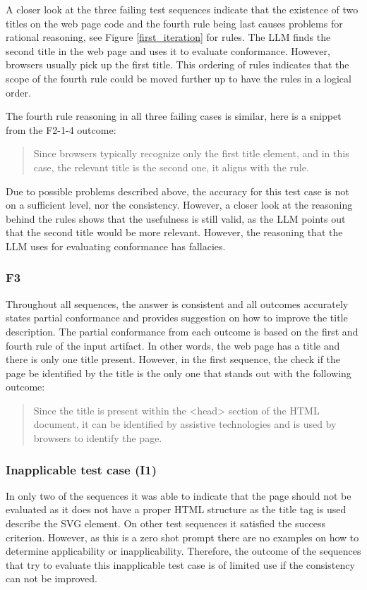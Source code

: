 A closer look at the three failing test sequences indicate that the existence of two titles on the web page code and the fourth rule being last causes problems for rational reasoning, see Figure \ref{first_iteration} for rules. The LLM finds the second title in the web page and uses it to evaluate conformance. However, browsers usually pick up the first title. This ordering of rules indicates that the scope of the fourth rule could be moved further up to have the rules in a logical order.

The fourth rule reasoning in all three failing cases is similar, here is a snippet from the F2-1-4 outcome: \blockquote{Since browsers typically recognize only the first title element, and in this case, the relevant title is the second one, it aligns with the rule.}

Due to possible problems described above, the accuracy for this test case is not on a sufficient level, nor the consistency. However, a closer look at the reasoning behind the rules shows that the usefulness is still valid, as the LLM points out that the second title would be more relevant. However, the reasoning that the LLM uses for evaluating conformance has fallacies.

\subsubsection{F3}

Throughout all sequences, the answer is consistent and all outcomes accurately states partial conformance and provides suggestion on how to improve the title description. The partial conformance from each outcome is based on the first and fourth rule of the input artifact. In other words, the web page has a title and there is only one title present. However, in the first sequence, the check if the page be identified by the title is the only one that stands out with the following outcome: \blockquote{Since the title is present within the <head> section of the HTML document, it can be identified by assistive technologies and is used by browsers to identify the page.}

\subsubsection{Inapplicable test case (I1)}

In only two of the sequences it was able to indicate that the page should not be evaluated as it does not have a proper HTML structure as the title tag is used describe the SVG element. On other test sequences it satisfied the success criterion. However, as this is a zero shot prompt there are no examples on how to determine applicability or inapplicability. Therefore, the outcome of the sequences that try to evaluate this inapplicable test case is of limited use if the consistency can not be improved.

